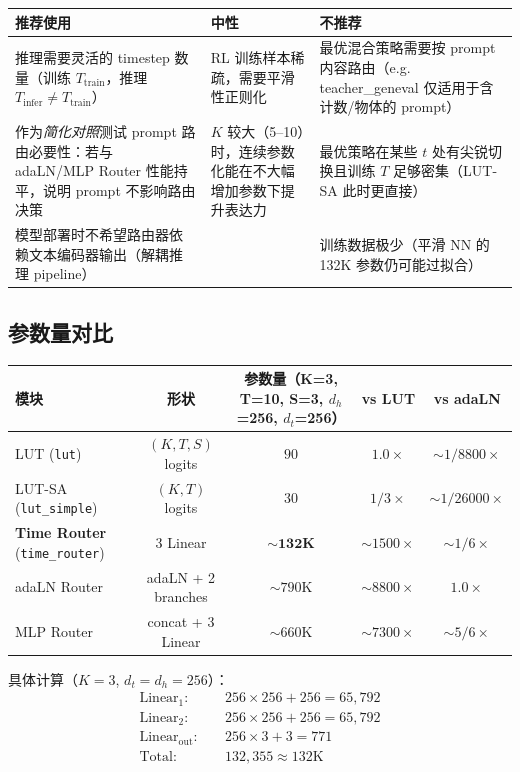 \documentclass[11pt,a4paper]{article}
\begin{document}
\begin{center}
\small
\begin{tabular}{p{4.2cm}|p{4.2cm}|p{4.2cm}}
\toprule
\textbf{推荐使用} & \textbf{中性} & \textbf{不推荐} \\
\midrule
推理需要灵活的 timestep 数量（训练 $T_{\text{train}}$，推理 $T_{\text{infer}} \neq T_{\text{train}}$） &
RL 训练样本稀疏，需要平滑性正则化 &
最优混合策略需要按 prompt 内容路由（e.g. teacher\_geneval 仅适用于含计数/物体的 prompt） \\
\midrule
作为\emph{简化对照}测试 prompt 路由必要性：若与 adaLN/MLP Router 性能持平，说明 prompt 不影响路由决策 &
$K$ 较大（5--10）时，连续参数化能在不大幅增加参数下提升表达力 &
最优策略在某些 $t$ 处有尖锐切换且训练 $T$ 足够密集（LUT-SA 此时更直接） \\
\midrule
模型部署时不希望路由器依赖文本编码器输出（解耦推理 pipeline） & & 训练数据极少（平滑 NN 的 132K 参数仍可能过拟合） \\
\bottomrule
\end{tabular}
\end{center}

\subsection{参数量对比}

\begin{center}
\small
\begin{tabular}{l|cc|c|c}
\toprule
\textbf{模块} & \textbf{形状} & \textbf{参数量}（K=3, T=10, S=3, $d_h$=256, $d_t$=256） & \textbf{vs LUT} & \textbf{vs adaLN} \\
\midrule
LUT (\texttt{lut}) & $(K, T, S)$ logits & $90$ & $1.0\times$ & $\sim 1/8800\times$ \\
LUT-SA (\texttt{lut\_simple}) & $(K, T)$ logits & $30$ & $1/3 \times$ & $\sim 1/26000\times$ \\
\textbf{Time Router} (\texttt{time\_router}) & 3 Linear & $\mathbf{\sim 132K}$ & $\sim 1500\times$ & $\sim 1/6 \times$ \\
adaLN Router & adaLN + 2 branches & $\sim 790$K & $\sim 8800\times$ & $1.0\times$ \\
MLP Router & concat + 3 Linear & $\sim 660$K & $\sim 7300\times$ & $\sim 5/6 \times$ \\
\bottomrule
\end{tabular}
\end{center}

具体计算（$K=3$, $d_t = d_h = 256$）：
\begin{align}
\text{Linear}_1: & \quad 256 \times 256 + 256 = 65{,}792 \\
\text{Linear}_2: & \quad 256 \times 256 + 256 = 65{,}792 \\
\text{Linear}_{\text{out}}: & \quad 256 \times 3 + 3 = 771 \\
\text{Total}: & \quad 132{,}355 \approx 132\text{K}
\end{align}
\end{document}

